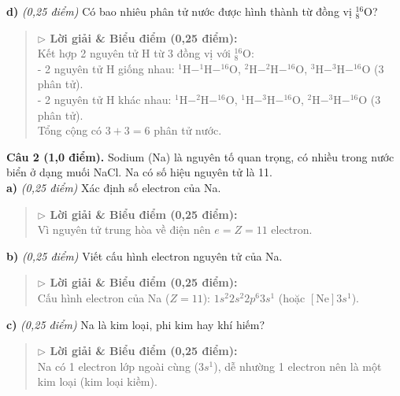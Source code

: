 \documentclass[11pt,a4paper]{article}
\begin{document}
\textbf{d)} \textit{(0,25 điểm)} Có bao nhiêu phân tử nước được hình thành từ đồng vị $^{16}_8\text{O}$?\\
\begin{quote}\small
{\color{myBlue}\textbf{$\triangleright$ Lời giải \& Biểu điểm (0,25 điểm):}}\\
Kết hợp 2 nguyên tử H từ 3 đồng vị với $^{16}_8\text{O}$:\\
- 2 nguyên tử H giống nhau: $^1\text{H}-^1\text{H}-^{16}\text{O}$, $^2\text{H}-^2\text{H}-^{16}\text{O}$, $^3\text{H}-^3\text{H}-^{16}\text{O}$ (3 phân tử).\\
- 2 nguyên tử H khác nhau: $^1\text{H}-^2\text{H}-^{16}\text{O}$, $^1\text{H}-^3\text{H}-^{16}\text{O}$, $^2\text{H}-^3\text{H}-^{16}\text{O}$ (3 phân tử).\\
Tổng cộng có $3 + 3 = 6$ phân tử nước.
\end{quote}


\textbf{Câu 2 (1,0 điểm).} Sodium (Na) là nguyên tố quan trọng, có nhiều trong nước biển ở dạng muối NaCl. Na có số hiệu nguyên tử là 11.\\
\textbf{a)} \textit{(0,25 điểm)} Xác định số electron của Na.\\
\begin{quote}\small
{\color{myBlue}\textbf{$\triangleright$ Lời giải \& Biểu điểm (0,25 điểm):}}\\
Vì nguyên tử trung hòa về điện nên $e = Z = 11$ electron.
\end{quote}

\textbf{b)} \textit{(0,25 điểm)} Viết cấu hình electron nguyên tử của Na.\\
\begin{quote}\small
{\color{myBlue}\textbf{$\triangleright$ Lời giải \& Biểu điểm (0,25 điểm):}}\\
Cấu hình electron của Na ($Z = 11$): $1s^2 2s^2 2p^6 3s^1$ (hoặc $[\text{Ne}]3s^1$).
\end{quote}

\textbf{c)} \textit{(0,25 điểm)} Na là kim loại, phi kim hay khí hiếm?\\
\begin{quote}\small
{\color{myBlue}\textbf{$\triangleright$ Lời giải \& Biểu điểm (0,25 điểm):}}\\
Na có 1 electron lớp ngoài cùng ($3s^1$), dễ nhường 1 electron nên là một kim loại (kim loại kiềm).
\end{quote}
\end{document}
